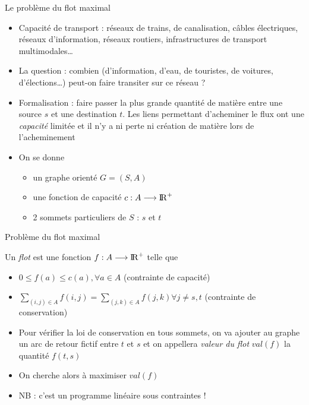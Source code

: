 
\begin{frame}{Le problème du flot maximal}
    \begin{itemize}
        \item Capacité de transport : réseaux de trains, de canalisation, câbles électriques, réseaux d'information, réseaux routiers, infrastructures de transport multimodales\dots
        \item La question : combien (d'information, d'eau, de touristes, de voitures,  d'élections\dots) peut-on faire transiter sur ce réseau ?
        \item Formalisation : faire passer la plus grande quantité de matière entre une source $s$ et une destination $t$. Les liens permettant d'acheminer le flux ont une \emph{capacité} limitée et il n'y a ni perte ni création de matière lors de l'acheminement 
        \item On se donne 
        \begin{itemize}
            \item un graphe orienté $G=(S,A)$
            \item une fonction de capacité $c : A \longrightarrow \mathrm{I\! R}^+$
            \item 2 sommets particuliers de $S$ : $s$ et $t$ 
        \end{itemize}
    \end{itemize}
\end{frame}

\begin{frame}{Problème du flot maximal}
    \begin{definition}
        Un \emph{flot} est une fonction $f : A \longrightarrow \mathrm{I\! R}^+$ telle que 
        \begin{itemize}
            \item $0 \leq f(a) \leq c(a), \forall a \in A$ (contrainte de capacité)
            \item $ \sum_{(i,j) \in A} f(i,j) = \sum_{(j,k) \in A} f(j,k) \forall j \neq s,t$ (contrainte de conservation)
        \end{itemize}
    \end{definition}
    \begin{itemize}
        \item Pour vérifier la loi de conservation en tous sommets, on va ajouter au graphe un arc de retour fictif entre $t$ et $s$ et on appellera \emph{valeur du flot} $val(f)$ la quantité $f(t,s)$ 
        \item On cherche alors à maximiser $val(f)$ 
        \item NB : c'est un programme linéaire sous contraintes !
    \end{itemize}
\end{frame}

